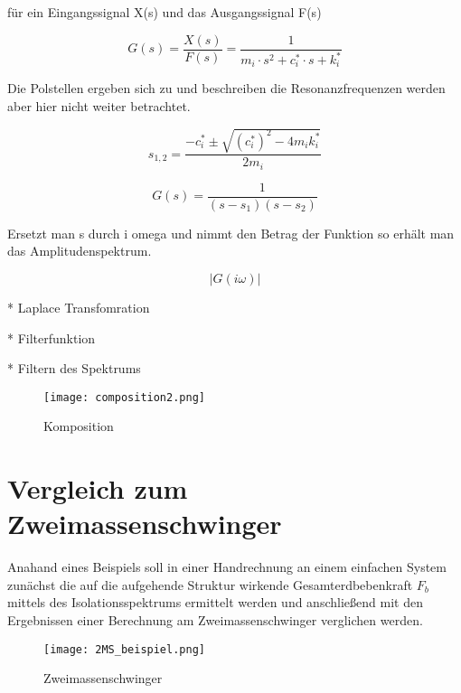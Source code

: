 für ein Eingangssignal X(s) und das Ausgangssignal F(s)

\begin{equation} \label{laplace2}
G(s)=\frac{X(s)}{F(s)} = \frac{1}{m_i \cdot s^2 + c_i^* \cdot s + k_i^*}
\end{equation}

Die Polstellen ergeben sich zu und beschreiben die Resonanzfrequenzen werden aber hier nicht weiter betrachtet.

\begin{equation} \label{laplace-pole}
s_{1,2} = \frac{-c_i^* \pm \sqrt{(c_i^*)^2 - 4m_ik_i^*}}{2m_i}
\end{equation}

\begin{equation} \label{laplace3}
G(s)=\frac{1}{(s-s_1)(s-s_2)}
\end{equation}

Ersetzt man s durch i omega und nimmt den Betrag der Funktion so erhält man das Amplitudenspektrum.

\begin{equation} \label{laplace-attan}
|G(i\omega)|
\end{equation}

* Laplace Transfomration

* Filterfunktion

* Filtern des Spektrums

\begin{figure}[ht]
    \centering
    \texttt{[image: composition2.png]}
    \caption{Komposition}
    \label{fig:composition}
\end{figure}


\pagebreak

\section{Vergleich zum Zweimassenschwinger}
\label{sec:vergleich}

Anahand eines Beispiels soll in einer Handrechnung an einem einfachen System zunächst die auf die aufgehende Struktur wirkende Gesamterdbebenkraft $F_b$ mittels des Isolationsspektrums ermittelt werden und anschließend mit den Ergebnissen einer Berechnung am Zweimassenschwinger verglichen werden.

\begin{figure}[ht]
    \centering
    \texttt{[image: 2MS\_beispiel.png]}
    \caption{Zweimassenschwinger}
    \label{fig:2ms}
\end{figure}

